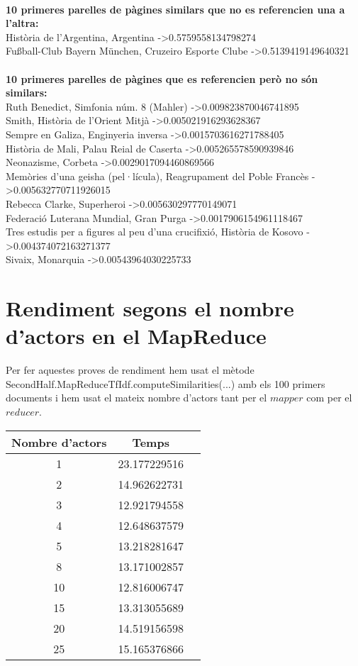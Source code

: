 \documentclass{report}
\begin{document}
 \\
\textbf{10 primeres parelles de pàgines similars que no es referencien una a l'altra:} \\
Història de l'Argentina, Argentina -\textgreater 0.5759558134798274 \\
Fußball-Club Bayern München, Cruzeiro Esporte Clube -\textgreater 0.5139419149640321 \\
 \\
\textbf{10 primeres parelles de pàgines que es referencien però no són similars:} \\
Ruth Benedict, Simfonia núm. 8 (Mahler) -\textgreater 0.009823870046741895 \\
Smith, Història de l'Orient Mitjà -\textgreater 0.005021916293628367 \\
Sempre en Galiza, Enginyeria inversa -\textgreater 0.0015703616271788405 \\
Història de Mali, Palau Reial de Caserta -\textgreater 0.005265578590939846 \\
Neonazisme, Corbeta -\textgreater 0.0029017094460869566 \\
Memòries d'una geisha (pel·lícula), Reagrupament del Poble Francès -\textgreater 0.005632770711926015 \\
Rebecca Clarke, Superheroi -\textgreater 0.005630297770149071 \\
Federació Luterana Mundial, Gran Purga -\textgreater 0.0017906154961118467 \\
Tres estudis per a figures al peu d'una crucifixió, Història de Kosovo -\textgreater 0.004374072163271377 \\
Sivaix, Monarquia -\textgreater 0.00543964030225733 \\

\newpage
\chapter{Rendiment segons el nombre d'actors en el MapReduce}

Per fer aquestes proves de rendiment hem usat el mètode SecondHalf.MapReduceTfIdf.computeSimilarities(...) amb els 100 primers documents i hem usat el mateix nombre d'actors tant per el $mapper$ com per el $reducer$.


\begin{center}
\begin{tabular}{| c | c | c |}
\hline
Nombre d'actors  & Temps \\ \hline
1  & 23.177229516 \\ \hline
2  & 14.962622731 \\ \hline
3  & 12.921794558 \\ \hline
4  & 12.648637579 \\ \hline
5  & 13.218281647 \\ \hline
8  & 13.171002857 \\ \hline
10 & 12.816006747 \\ \hline
15 & 13.313055689 \\ \hline
20 & 14.519156598 \\ \hline
25 & 15.165376866 \\
\hline
\end{tabular}
\end{center}
\end{document}
